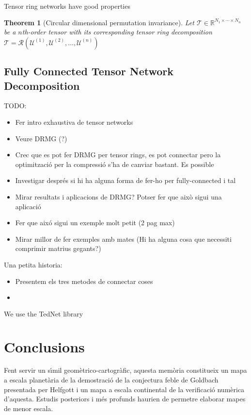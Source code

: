 \documentclass[11pt,a4paper,openright,oneside]{book}
\numberwithin{equation}{section}
\newtheorem{thm0}[defn0]{Theorem}
\newenvironment{theorem}{\bigskip \begin{thm0}}{\end{thm0}}
\begin{document}
Tensor ring networks have good properties \cite{zhaoTensorRingDecomposition2016}

\begin{theorem} [Circular dimensional permutation invariance] Let $\mathcal{T} \in \mathbb{R}^{N_1 \times \cdots \times N_n}$ be
    a $n$th-order tensor with its corresponding tensor ring decomposition $\mathcal{T} = \mathcal{R}(\mathcal{U}^{(1)}, \mathcal{U}^{(2)}, \dots, \mathcal{U}^{(n)})$
\end{theorem}



\section{Fully Connected Tensor Network Decomposition}




TODO:
\begin{itemize}
\item Fer intro exhaustiva de tensor networks
\item Veure DRMG (?)
\item Crec que es pot fer DRMG per tensor rings, es pot connectar pero la optimització per la compressió s'ha de canviar bastant. Es possible
\item Investigar després si hi ha alguna forma de fer-ho per fully-connected i tal
\item Mirar resultats i aplicacions de DRMG? Potser fer que això sigui una aplicació
\item Fer que aixó sigui un exemple molt petit (2 pag max)
\item Mirar millor de fer exemples amb mates (Hi ha alguna cosa que necessiti comprimir matrius gegants?)
\end{itemize}


Una petita historia:

\begin{itemize}
    \item Presentem els tres metodes de connectar coses
    \item 
\end{itemize}

We use the TedNet library \cite{panTedNetPytorchToolkit2022}

\chapter{Conclusions}

Fent servir un s\'{\i}mil geom\`etrico-cartogr\`afic, aquesta mem\`oria constitueix un mapa a escala planet\`aria de la demostraci\'o de la conjectura feble de Goldbach presentada per Helfgott i un mapa a escala continental de la verificaci\'o num\`erica d'aquesta. Estudis posteriors i m\'es profunds haurien de permetre elaborar mapes de menor escala.
\end{document}
